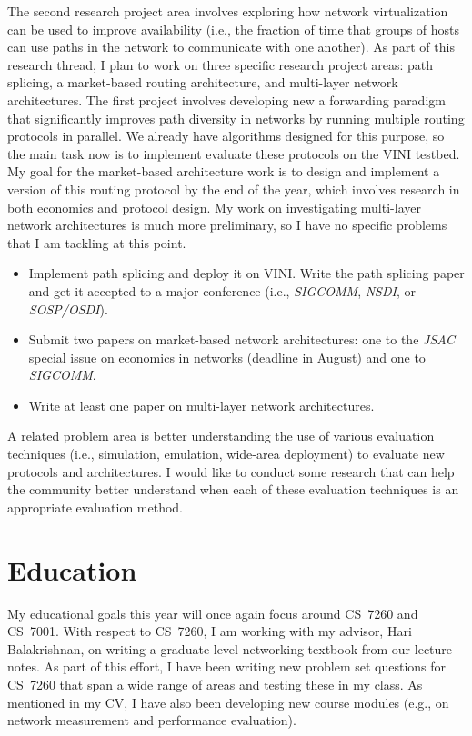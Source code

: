 \begin{sloppypar}
The second research project area involves exploring how network
virtualization can be used to improve availability (i.e., the fraction
of time that groups of hosts can use paths in the network to communicate
with one another).  As part of this research thread, I plan to work on
three specific research project areas: path splicing, a market-based
routing architecture, and multi-layer network architectures.  The first
project involves developing new a forwarding paradigm that significantly
improves path diversity in networks by running multiple routing
protocols in parallel.  We already have algorithms designed for this
purpose, so the main task now is to implement evaluate these protocols
on the VINI testbed.  My goal for the market-based architecture work is
to design and implement a version of this routing protocol by the end of
the year, which involves research in both economics and protocol design.
My work on investigating multi-layer network architectures is much more
preliminary, so I have no specific problems that I am tackling at this
point.

\begin{itemize}
\itemsep=-1pt
\item Implement path splicing and deploy it on VINI.  Write the path
  splicing paper and get it accepted to a major conference (i.e., {\em
  SIGCOMM}, {\em NSDI}, or {\em SOSP/OSDI}).
\item Submit two papers on market-based network architectures: one to
  the {\em JSAC} special issue on economics in networks (deadline in
  August) and one to {\em SIGCOMM}.
\item Write at least one paper on multi-layer network architectures.  
\end{itemize}

A related problem area is better understanding the use of various
evaluation techniques (i.e., simulation, emulation, wide-area
deployment) to evaluate new protocols and architectures.  I would like
to conduct some research that can help the community better understand
when each of these evaluation techniques is an appropriate evaluation
method. 

\section*{Education}

My educational goals this year will once again focus around CS~7260 and
CS~7001.  With respect to CS~7260, I am working with my advisor, Hari
Balakrishnan, on writing a graduate-level networking textbook from our
lecture notes.  As part of this effort, I have been writing new problem
set questions for CS~7260 that span a wide range of areas and testing
these in my class.  As mentioned in my CV, I have also been developing
new course modules (e.g., on network measurement and performance
evaluation).  


\end{sloppypar}
